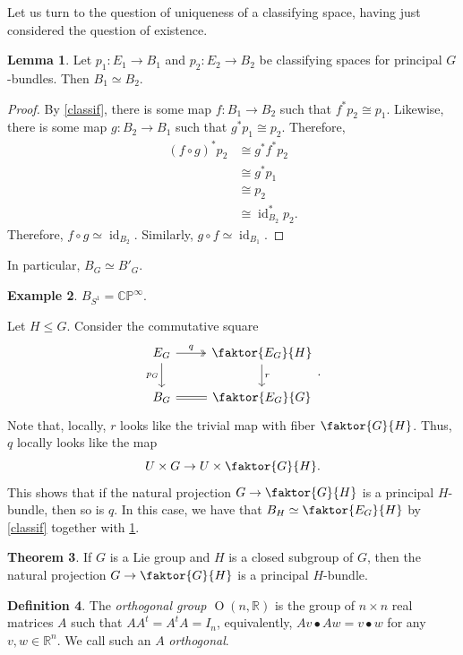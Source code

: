 \documentclass[10pt,letterpaper,cm]{nupset}
\theoremstyle{definition}
\newtheorem{defn}{Definition}[subsection]
\newtheorem{exmp}[defn]{Example}
\theoremstyle{theorem}
\newtheorem{theorem}[defn]{Theorem}
\newtheorem{lemma}[defn]{Lemma}
\theoremstyle{remark}
\newcommand{\CP}{\mathbb{CP}}
\newcommand{\R}{\mathbb{R}}
\newcommand{\1}{\mathbb{1}}
\newcommand{\0}{\vec 0}
\DeclareMathOperator{\id}{id}
\DeclareMathOperator{\Or}{O}
\begin{document}
\medskip

Let us turn to the question of uniqueness of a classifying space, having just considered the question of existence.

\begin{lemma}\label{uniq}
Let $p_1: E_1 \to B_1$ and $p_2 : E_2 \to B_2$ be classifying spaces for principal $G$-bundles. Then $B_1 \simeq B_2$. 
\end{lemma}
\begin{proof}
By \cref{classif}, there is some map $f : B_1 \to B_2$ such that $f^{\ast}{p_2} \cong  p_1$. Likewise, there is some map $g: B_2 \to B_1$ such that $g^{\ast}{p_1}\cong p_2$. Therefore, 
\begin{align*}
\left(f \circ g\right)^{\ast}{p_2} & \cong g^{\ast}{f^{\ast}{p_2}} 
\\ & \cong g^{\ast}{p_1}
\\ & \cong p_2
\\ & \cong \id_{B_2}^{\ast}{p_2}.
\end{align*}
Therefore, $f \circ g \simeq \id_{B_2}$. Similarly, $g\circ f \simeq \id_{B_1}$.
\end{proof}

In particular, $B_G \simeq B'_G$.

\begin{exmp}\label{classcirc}
$B_{S^1} = \CP^{\infty}$.
\end{exmp}


Let $H\leq G$. Consider the commutative square
\[
\begin{tikzcd}
E_G \arrow[d, "p_G"'] \arrow[r, "q", two heads] & \faktor{E_G}{H} \arrow[d, "r"] \\
B_G \arrow[r, equals]                                   & \faktor{E_G}{G}               
\end{tikzcd}.
\]  Note that, locally, $r$ looks like the trivial map with fiber $\faktor{G}{H}$. Thus, $q$ locally looks like the map $$U \times G \to U \times \faktor{G}{H}.$$ This shows that if the natural projection $G \to \faktor{G}{H}$ is a principal $H$-bundle, then so is $q$. In this case, we have that $B_H \simeq \faktor{E_G}{H}$ by \cref{classif} together with \cref{uniq}.


\begin{theorem}\label{H-bund}
If $G$ is a Lie group and $H$ is a closed subgroup of $G$, then the natural projection $G \to \faktor{G}{H}$ is a principal $H$-bundle. 
\end{theorem}

\begin{defn}
The \textit{orthogonal group $\Or\left(n, \R\right)$} is the group of $n\times n$ real matrices $A$ such that $AA^t = A^tA = I_n$, equivalently, $Av \bullet Aw = v\bullet w$ for any $v,w\in \R^n$. We call such an $A$ \textit{orthogonal}.
\end{defn}
\end{document}
